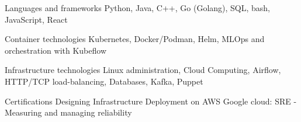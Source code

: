 \vspace{-0.5cm}

\begin{cvskills}

  \cvskill
    {Languages and frameworks} %
    {Python, Java, C++, Go (Golang), SQL, bash, JavaScript, React} %

  \cvskill
    {Container technologies} %
    {Kubernetes, Docker/Podman, Helm, MLOps and orchestration with Kubeflow} %

  \cvskill
    {Infrastructure technologies} %
    {Linux administration, Cloud Computing, Airflow, HTTP/TCP load-balancing, Databases, Kafka, Puppet} %

  \cvskill
    {Certifications} %
    {\newline Designing Infrastructure Deployment on AWS \newline Google cloud: SRE - Measuring and managing reliability} %

\end{cvskills}
